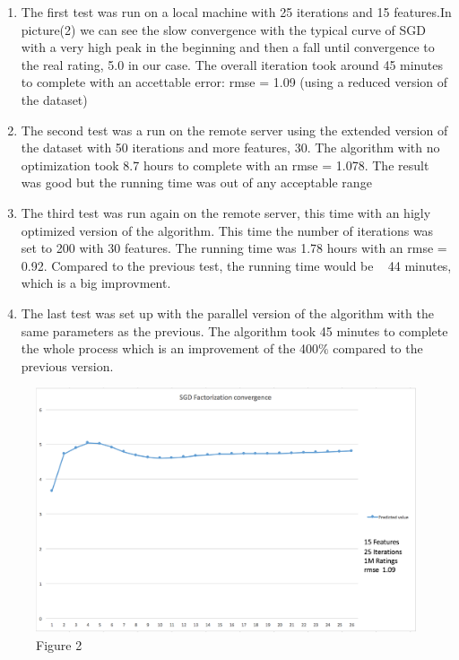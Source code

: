 \documentclass{sig-alternate-05-2015}
\begin{document}
\begin{enumerate}
  \item The first test was run on a local machine with 25 iterations and 15 features.In picture(2) we can see the slow convergence with the typical curve of SGD with a
  very high peak in the beginning and then a fall until convergence to the real rating, 5.0 in our case. The overall iteration took around 45 minutes to complete with an
  accettable error: rmse = 1.09 (using a reduced version of the dataset)
  \item The second test was a run on the remote server using the extended version of the dataset with  50 iterations and more features, 30. The algorithm with no optimization
  took 8.7 hours to complete with an rmse = 1.078. The result was good but the running time was out of any acceptable range
  \item The third test was run again on the remote server, this time with an higly optimized version of the algorithm. This time the number of iterations was set to 200 with 30 features.
  The running time was 1.78 hours with an rmse = 0.92. Compared to the previous test, the running time would be ~ 44 minutes, which is a big improvment.
  \item The last test was set up with the parallel version of the algorithm with the same parameters as the previous. The algorithm took 45 minutes to complete the whole process
  which is an improvement of the 400$\%$ compared to the previous version.
\end{enumerate}
\begin{figure}
    \caption{Figure 2}
    \centering
    \includegraphics[scale=0.175]{chart.png}
\end{figure}
\end{document}
